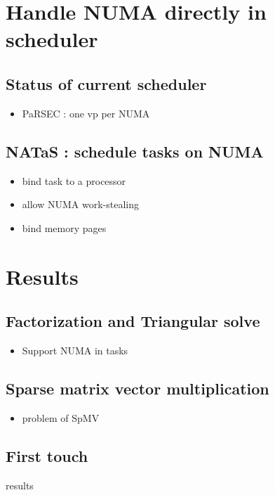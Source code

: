 \documentclass[oneside,12t]{classes/Thesis}
\begin{document}
\section{Handle NUMA directly in scheduler}
\subsection{Status of current scheduler}
  \begin{itemize}
    \item PaRSEC : one vp per NUMA
  \end{itemize}
\subsection{NATaS : schedule tasks on NUMA}
  \begin{itemize}
    \item bind task to a processor
    \item allow NUMA work-stealing
    \item bind memory pages
  \end{itemize}


\section{Results}
\subsection{Factorization and Triangular solve}
  \begin{itemize}
    \item Support NUMA in tasks
  \end{itemize}
\subsection{Sparse matrix vector multiplication}
  \begin{itemize}
    \item problem of SpMV
  \end{itemize}
\subsection{First touch}
results
\end{document}
